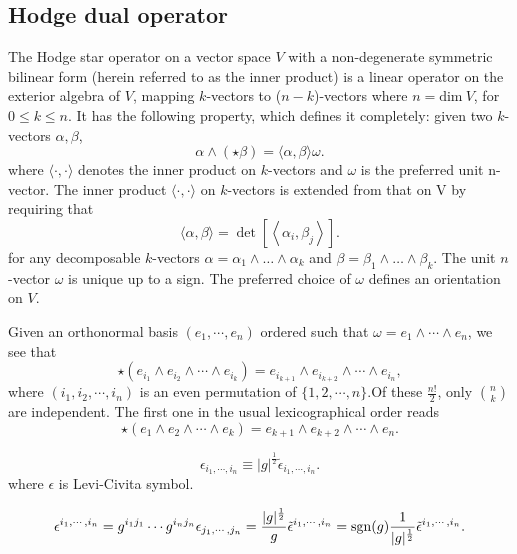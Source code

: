 \subsection{Hodge dual operator}
\begin{newdef}
The Hodge star operator on a vector space $V$ with a non-degenerate symmetric bilinear form (herein referred to as the inner product) is a linear operator on the exterior algebra of $V$, mapping $k$-vectors to ($n-k$)-vectors where $n = \text{dim} \ V$, for $ 0 \leq k \leq n$. It has the following property, which defines it completely: given two $k$-vectors $\alpha,\beta$,
\[\alpha \wedge (\star \beta )=\langle \alpha ,\beta \rangle \omega.\]
where $\langle \cdot ,\cdot \rangle$ denotes the inner product on $k$-vectors and $\omega$ is the preferred unit n-vector.
The inner product $\langle \cdot ,\cdot \rangle$ on $k$-vectors is extended from that on V by requiring that
\[\langle \alpha ,\beta \rangle =\det \left[\left\langle \alpha _{i},\beta _{j}\right\rangle \right].\]
for any decomposable $k$-vectors $\alpha =\alpha _{1}\wedge \dots \wedge \alpha _{k}$ and $\beta =\beta _{1}\wedge \dots \wedge \beta _{k}$. The unit $n$-vector $\omega$ is unique up to a sign. The preferred choice of $\omega$ defines an orientation on $V$.
\end{newdef}
\noindent
Given an orthonormal basis $(e_{1},\cdots ,e_{n})$ ordered such that $\omega =e_{1}\wedge \cdots \wedge e_{n}$, we see that
\[\star (e_{i_{1}}\wedge e_{i_{2}}\wedge \cdots \wedge e_{i_{k}})=e_{i_{k+1}}\wedge e_{i_{k+2}}\wedge \cdots \wedge e_{i_{n}},\]
where $(i_{1},i_{2},\cdots ,i_{n})$ is an even permutation of $\{1,2,\cdots,n\}$.Of these $\frac{n!}{2}$, only $n \choose k$ are independent. The first one in the usual lexicographical order reads
\[\star (e_{1}\wedge e_{2}\wedge \cdots \wedge e_{k})=e_{k+1}\wedge e_{k+2}\wedge \cdots \wedge e_{n}.\]

\begin{newdef}
\[\epsilon_{i_1,\cdots,i_n} \equiv |g|^{\frac{1}{2}} \tilde{\epsilon}_{i_1,\cdots,i_n} .\]
where $\epsilon$ is Levi-Civita symbol.
\end{newdef} 
\begin{newprop}
\[\epsilon^{i_1,\cdots,i_n} = g^{i_1j_1} \cdots g^{i_nj_n} \epsilon_{j_1,\cdots,j_n} = \frac{|g|^{\frac{1}{2}}}{g} \tilde{\epsilon}^{i_1,\cdots,i_n} = {\rm sgn}(g) \frac{1}{|g|^{\frac{1}{2}}} \tilde{\epsilon}^{i_1,\cdots,i_n}.\]
\end{newprop}

